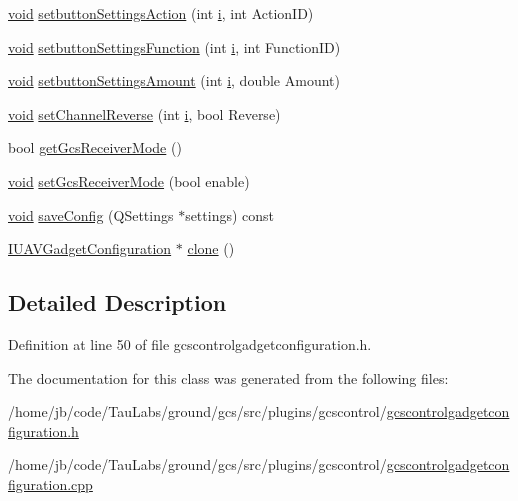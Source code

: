 \begin{DoxyCompactItemize}
\item 
\hyperlink{group___u_a_v_objects_plugin_ga444cf2ff3f0ecbe028adce838d373f5c}{void} \hyperlink{group___g_c_s_control_gadget_plugin_ga59dbcf37f9417c485b9c8a021563a530}{setbutton\-Settings\-Action} (int \hyperlink{uavobjecttemplate_8m_a6f6ccfcf58b31cb6412107d9d5281426}{i}, int \-Action\-I\-D)
\item 
\hyperlink{group___u_a_v_objects_plugin_ga444cf2ff3f0ecbe028adce838d373f5c}{void} \hyperlink{group___g_c_s_control_gadget_plugin_ga67d36d085e0ada006406d7cd2569e226}{setbutton\-Settings\-Function} (int \hyperlink{uavobjecttemplate_8m_a6f6ccfcf58b31cb6412107d9d5281426}{i}, int \-Function\-I\-D)
\item 
\hyperlink{group___u_a_v_objects_plugin_ga444cf2ff3f0ecbe028adce838d373f5c}{void} \hyperlink{group___g_c_s_control_gadget_plugin_ga1f4c5dc258f49bb185227cb603dbd088}{setbutton\-Settings\-Amount} (int \hyperlink{uavobjecttemplate_8m_a6f6ccfcf58b31cb6412107d9d5281426}{i}, double \-Amount)
\item 
\hyperlink{group___u_a_v_objects_plugin_ga444cf2ff3f0ecbe028adce838d373f5c}{void} \hyperlink{group___g_c_s_control_gadget_plugin_gae6d33c4f9082a7cee4223f5793c82a45}{set\-Channel\-Reverse} (int \hyperlink{uavobjecttemplate_8m_a6f6ccfcf58b31cb6412107d9d5281426}{i}, bool \-Reverse)
\item 
bool \hyperlink{group___g_c_s_control_gadget_plugin_ga0b4cab5db5d6ffe6b93d7cb9be5de2c8}{get\-Gcs\-Receiver\-Mode} ()
\item 
\hyperlink{group___u_a_v_objects_plugin_ga444cf2ff3f0ecbe028adce838d373f5c}{void} \hyperlink{group___g_c_s_control_gadget_plugin_gac753abb3d8930e2296c8e9c056a4ee1f}{set\-Gcs\-Receiver\-Mode} (bool enable)
\item 
\hyperlink{group___u_a_v_objects_plugin_ga444cf2ff3f0ecbe028adce838d373f5c}{void} \hyperlink{group___g_c_s_control_gadget_plugin_ga5b7df7d2f0deddc5241efd65f199fb05}{save\-Config} (\-Q\-Settings $\ast$settings) const 
\item 
\hyperlink{group___core_plugin_gacdfdf0b1e39b5002472b76b6564ce51f}{\-I\-U\-A\-V\-Gadget\-Configuration} $\ast$ \hyperlink{group___g_c_s_control_gadget_plugin_ga2fcb5b20028b10d2b13fcebe34b82f0f}{clone} ()
\end{DoxyCompactItemize}


\subsection{\-Detailed \-Description}


\-Definition at line 50 of file gcscontrolgadgetconfiguration.\-h.



\-The documentation for this class was generated from the following files\-:\begin{DoxyCompactItemize}
\item 
/home/jb/code/\-Tau\-Labs/ground/gcs/src/plugins/gcscontrol/\hyperlink{gcscontrolgadgetconfiguration_8h}{gcscontrolgadgetconfiguration.\-h}\item 
/home/jb/code/\-Tau\-Labs/ground/gcs/src/plugins/gcscontrol/\hyperlink{gcscontrolgadgetconfiguration_8cpp}{gcscontrolgadgetconfiguration.\-cpp}\end{DoxyCompactItemize}
